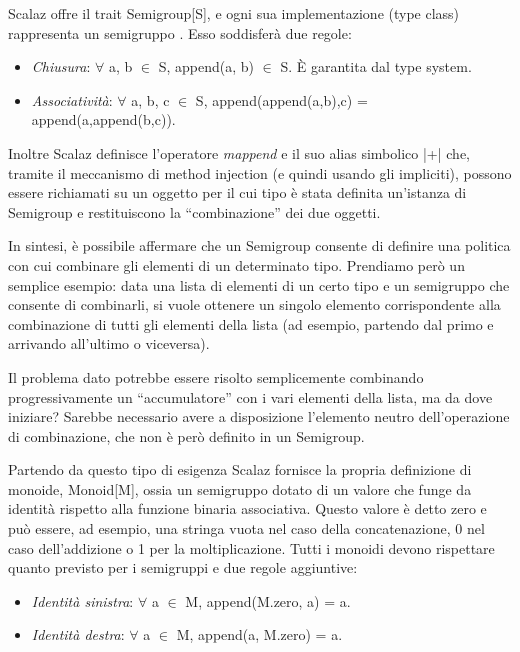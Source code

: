 Scalaz offre il trait Semigroup[S], e ogni sua implementazione (type class) rappresenta un semigruppo \cite{TowardsScalaz1}. Esso soddisferà due regole:

\begin{itemize}
\item \textit{Chiusura}: $\forall$ a, b $\in$ S, append(a, b) $\in$ S. È garantita dal type system.
\item \textit{Associatività}: $\forall$ a, b, c $\in$ S, append(append(a,b),c) = append(a,append(b,c)).
\end{itemize}

Inoltre Scalaz definisce l'operatore \textit{mappend} e il suo alias simbolico |+| che, tramite il meccanismo di method injection (e quindi usando gli impliciti), possono essere richiamati su un oggetto per il cui tipo è stata definita un'istanza di Semigroup e restituiscono la ``combinazione'' dei due oggetti.



In sintesi, è possibile affermare che un Semigroup consente di definire una politica con cui combinare gli elementi di un determinato tipo. Prendiamo però un semplice esempio: data una lista di elementi di un certo tipo e un semigruppo che consente di combinarli, si vuole ottenere un singolo elemento corrispondente alla combinazione di tutti gli elementi della lista (ad esempio, partendo dal primo e arrivando all'ultimo o viceversa).

Il problema dato potrebbe essere risolto semplicemente combinando progressivamente un ``accumulatore'' con i vari elementi della lista, ma da dove iniziare? Sarebbe necessario avere a disposizione l'elemento neutro dell'operazione di combinazione, che non è però definito in un Semigroup.

Partendo da questo tipo di esigenza Scalaz fornisce la propria definizione di monoide, Monoid[M], ossia un semigruppo dotato di un valore che funge da identità rispetto alla funzione binaria associativa. Questo valore è detto zero e può essere, ad esempio, una stringa vuota nel caso della concatenazione, 0 nel caso dell'addizione o 1 per la moltiplicazione. Tutti i monoidi devono rispettare quanto previsto per i semigruppi e due regole aggiuntive:

\begin{itemize}
\item \textit{Identità sinistra}: $\forall$ a $\in$ M, append(M.zero, a) = a.
\item \textit{Identità destra}: $\forall$ a $\in$ M, append(a, M.zero) = a.
\end{itemize}

